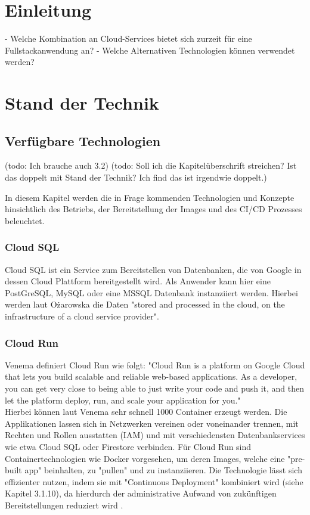 \documentclass[pdftex,a4paper,abstracton,11pt,parskip=half,bibtotocnumbered]{scrartcl}
\begin{document}
\section{Einleitung}
 - Welche Kombination an Cloud-Services bietet sich zurzeit für eine Fullstackanwendung an?
 - Welche Alternativen Technologien können verwendet werden?


\section{Stand der Technik}

	\subsection{Verfügbare Technologien} 
	(todo: Ich brauche auch 3.2)
	(todo: Soll ich die Kapitelüberschrift streichen? Ist das doppelt mit Stand der Technik? Ich find das ist irgendwie doppelt.)

	In diesem Kapitel werden die in Frage kommenden Technologien und Konzepte hinsichtlich des Betriebs, der Bereitstellung der Images und des
	CI/CD Prozesses beleuchtet. 

		\subsubsection{Cloud SQL}		
			Cloud SQL ist ein Service zum Bereitstellen von Datenbanken, die von Google in dessen Cloud Plattform bereitgestellt wird. Als Anwender kann hier eine
			PostGreSQL, MySQL oder eine MSSQL Datenbank instanziiert werden. Hierbei werden laut Ożarowska die Daten "stored and processed in the cloud, on the infrastructure of a cloud 
			service provider". \cite{ożarowska_2020}

		\subsubsection{Cloud Run}
			Venema definiert Cloud Run wie folgt: "Cloud Run is a platform on Google Cloud that lets you build scalable and reliable web-based applications. As
 			a developer, you can get very close to being able to just write your code and push it, and then let the platform deploy, run, and scale your application for you." \cite[S.1]{Venema_2021} \\
			Hierbei können laut Venema sehr schnell 1000 Container erzeugt werden. \cite[vgl.][S.XVI]{Venema_2021}
			Die Applikationen lassen sich in Netzwerken vereinen oder voneinander trennen, mit Rechten und Rollen ausstatten (IAM) und mit verschiedensten 
			Datenbankservices wie etwa Cloud SQL oder Firestore verbinden. Für Cloud Run sind Containertechnologien wie Docker vorgesehen, um deren Images, 
			welche eine "pre-built app" \cite{johnson_2020} beinhalten, zu "pullen" und zu instanziieren. Die Technologie lässt sich effizienter nutzen, indem sie mit "Continuous 
			Deployment" kombiniert wird (siehe Kapitel 3.1.10), da hierdurch der administrative Aufwand von zukünftigen Bereitstellungen reduziert wird \cite{lamm_2021}.
\end{document}
